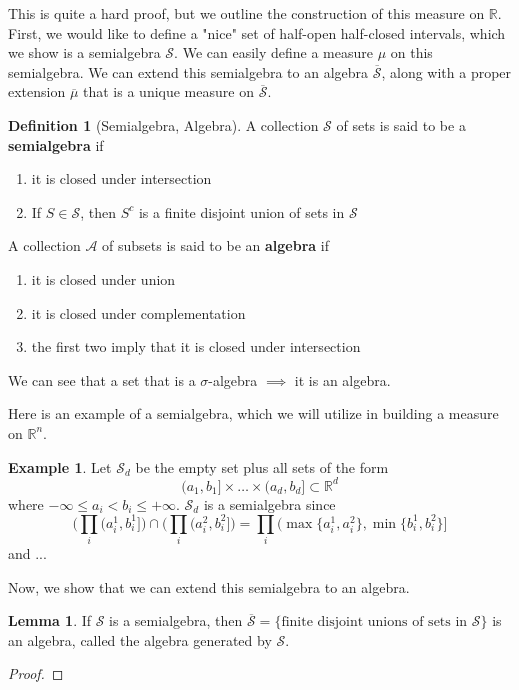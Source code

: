 \documentclass{article}
\theoremstyle{definition}
\newtheorem{lemma}[theorem]{Lemma}
\newtheorem{example}{Example}[section]
\theoremstyle{remark}
\theoremstyle{definition}
\newtheorem{definition}{Definition}[section]
\begin{document}
This is quite a hard proof, but we outline the construction of this measure on $\mathbb{R}$. First, we would like to define a "nice" set of half-open half-closed intervals, which we show is a semialgebra $\mathcal{S}$. We can easily define a measure $\mu$ on this semialgebra. We can extend this semialgebra to an algebra $\overline{\mathcal{S}}$, along with a proper extension $\overline{\mu}$ that is a unique measure on $\overline{\mathcal{S}}$. 

\begin{definition}[Semialgebra, Algebra]
A collection $\mathcal{S}$ of sets is said to be a \textbf{semialgebra} if 
\begin{enumerate}
    \item it is closed under intersection 
    \item If $S \in \mathcal{S}$, then $S^c$ is a finite disjoint union of sets in $\mathcal{S}$
\end{enumerate}
A collection $\mathcal{A}$ of subsets is said to be an \textbf{algebra} if 
\begin{enumerate}
    \item it is closed under union 
    \item it is closed under complementation
    \item the first two imply that it is closed under intersection
\end{enumerate}
We can see that a set that is a $\sigma$-algebra $\implies$ it is an algebra. 
\end{definition}

Here is an example of a semialgebra, which we will utilize in building a measure on $\mathbb{R}^n$.  

\begin{example}
Let $\mathcal{S}_d$ be the empty set plus all sets of the form 
\[(a_1, b_1] \times \ldots \times (a_d, b_d] \subset \mathbb{R}^d\]
where $-\infty \leq a_i < b_i \leq +\infty$. $\mathcal{S}_d$ is a semialgebra since 
\[\bigg( \prod_i (a_i^1 , b_i^1] \bigg) \cap \bigg( \prod_i (a_i^2, b_i^2] \bigg) = \prod_i (\max\{a_i^1, a_i^2\}, \min\{b_i^1, b_i^2\}]\]
and ...
\end{example}

Now, we show that we can extend this semialgebra to an algebra. 

\begin{lemma}
If $\mathcal{S}$ is a semialgebra, then $\overline{\mathcal{S}} = \{\text{finite disjoint unions of sets in } \mathcal{S}\}$ is an algebra, called the algebra generated by $\mathcal{S}$. 
\end{lemma}
\begin{proof}

\end{proof}
\end{document}
